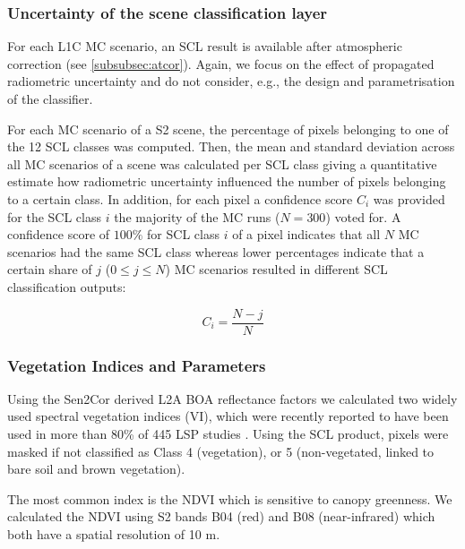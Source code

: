 \subsubsection{Uncertainty of the scene classification layer}
\label{subsubsec:slc_uncertainty}
For each L1C \gls{MC} scenario, an \gls{SCL} result is available after atmospheric correction (see \ref{subsubsec:atcor}). Again, we focus on the effect of propagated radiometric uncertainty and do not consider, e.g., the design and parametrisation of the classifier.

For each  \gls{MC} scenario of a \gls{S2} scene, the percentage of pixels belonging to one of the 12 \gls{SCL} classes was computed. Then, the mean and standard deviation across all  \gls{MC} scenarios of a scene was calculated per \gls{SCL} class giving a quantitative estimate how radiometric uncertainty influenced the number of pixels belonging to a certain class. In addition, for each pixel a confidence score $C_i$ was provided for the \gls{SCL} class $i$ the majority of the  \gls{MC} runs ($N=300$) voted for. A confidence score of $100\%$ for \gls{SCL} class $i$ of a pixel indicates that all $N$  \gls{MC} scenarios had the same \gls{SCL} class whereas lower percentages indicate that a certain share of $j$ ($0 \le j \le N$)  \gls{MC} scenarios resulted in different \gls{SCL} classification outputs:

\begin{equation}
    \label{eq:confidence-score}
    C_i = \frac{N-j}{N}
\end{equation}

\subsubsection{Vegetation Indices and Parameters}
\label{subsubsec:vis_and_params}
\label{subsubsec:vis_params}
Using the Sen2Cor derived L2A BOA reflectance factors we calculated two widely used spectral vegetation indices (VI), which were recently reported to have been used in more than 80\% of 445 \gls{LSP} studies \citep{caparros-santiago_land_2021}. Using the \gls{SCL} product, pixels were masked if not classified as Class 4 (vegetation), or 5 (non-vegetated, linked to bare soil and brown vegetation).

The most common index is the \gls{NDVI} \citep{rouse_monitoring_1974} which is sensitive to canopy greenness. We calculated the \gls{NDVI} using \gls{S2} bands B04 (red) and B08 (near-infrared) which both have a spatial resolution of 10 m.

